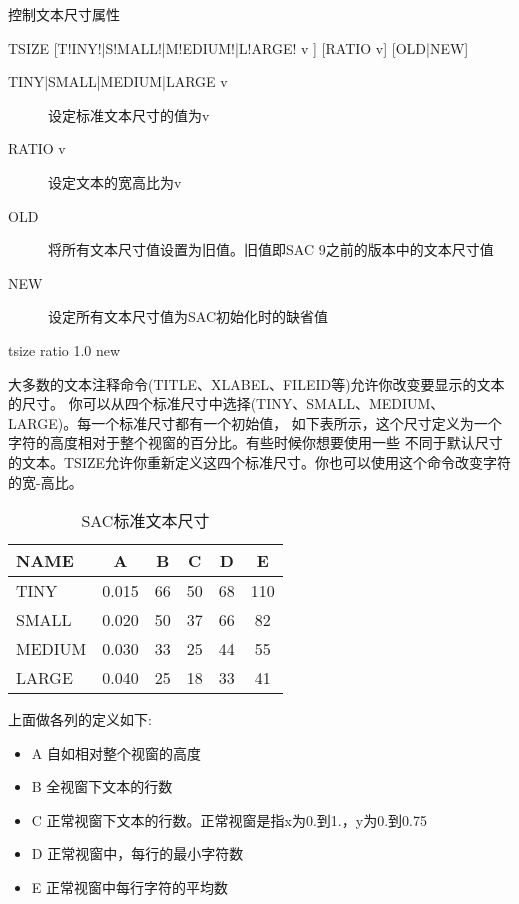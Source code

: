 \label{cmd:tsize}

控制文本尺寸属性

\begin{SACSTX}
TSIZE [T!INY!|S!MALL!|M!EDIUM!|L!ARGE! v ] [RATIO v] [OLD|NEW]
\end{SACSTX}

\begin{description}
\item [TINY|SMALL|MEDIUM|LARGE v] 设定标准文本尺寸的值为v 
\item [RATIO v] 设定文本的宽高比为v 
\item [OLD] 将所有文本尺寸值设置为旧值。旧值即SAC 9之前的版本中的文本尺寸值
\item [NEW] 设定所有文本尺寸值为SAC初始化时的缺省值
\end{description}

\begin{SACDFT}
tsize ratio 1.0 new
\end{SACDFT}

大多数的文本注释命令(TITLE、XLABEL、FILEID等)允许你改变要显示的文本的尺寸。
你可以从四个标准尺寸中选择(TINY、SMALL、MEDIUM、LARGE)。每一个标准尺寸都有一个初始值，
如下表所示，这个尺寸定义为一个字符的高度相对于整个视窗的百分比。有些时候你想要使用一些
不同于默认尺寸的文本。TSIZE允许你重新定义这四个标准尺寸。你也可以使用这个命令改变字符的宽-高比。
\begin{table}[!ht]
\centering
\caption{SAC标准文本尺寸}
\begin{tabular}{lccccc}
\toprule
NAME	&	A	&	B	&	C	&	D	&	E	\\
\midrule
TINY 	& 0.015 &   66 	&  50  	&	68  &	110	\\
SMALL	& 0.020 &	50  &  37  	&	66  &	82	\\
MEDIUM  & 0.030 &	33  &  25  	&	44  &	55	\\
LARGE	& 0.040 &	25  &  18  	&	33  &	41	\\
\bottomrule
\end{tabular}
\end{table}

上面做各列的定义如下:
\begin{itemize}
\item A 自如相对整个视窗的高度
\item B 全视窗下文本的行数
\item C 正常视窗下文本的行数。正常视窗是指x为0.到1.，y为0.到0.75
\item D 正常视窗中，每行的最小字符数
\item E 正常视窗中每行字符的平均数
\end{itemize}


